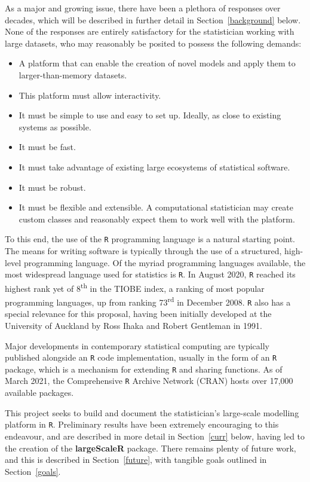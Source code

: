 As a major and growing issue, there have been a plethora of responses over decades, which will be described in further detail in Section~\ref{background} below.
None of the responses are entirely satisfactory for the statistician working with large datasets, who may reasonably be posited to possess the following demands:

\begin{itemize}
        \item A platform that can enable the creation of novel models and apply them to larger-than-memory datasets.
        \item This platform must allow interactivity.
        \item It must be simple to use and easy to set up.
                Ideally, as close to existing systems as possible.
        \item It must be fast.
        \item It must take advantage of existing large ecosystems of statistical software.
        \item It must be robust.
        \item It must be flexible and extensible.
                A computational statistician may create custom classes and reasonably expect them to work well with the platform.
\end{itemize}

To this end, the use of the \texttt{R} programming language is a natural starting point.
The means for writing software is typically through the use of a structured, high-level programming language.
Of the myriad programming languages available, the most widespread language used for statistics is \texttt{R}.
In August 2020, \texttt{R} reached its highest rank yet of 8\textsuperscript{th} in the TIOBE index, a ranking of most popular programming languages, up from ranking 73\textsuperscript{rd} in December 2008\cite{tiobe2021r}.
\texttt{R} also has a special relevance for this proposal, having been initially developed at the University of Auckland by Ross Ihaka and Robert Gentleman in 1991\cite{ihaka1996r}.

Major developments in contemporary statistical computing are typically published alongside an \texttt{R} code implementation, usually in the form of an \texttt{R} package, which is a mechanism for extending \texttt{R} and sharing functions.
As of March 2021, the Comprehensive \texttt{R} Archive Network (CRAN) hosts over 17,000 available packages\cite{team20:_r}.

This project seeks to build and document the statistician's large-scale modelling platform in \texttt{R}.
Preliminary results have been extremely encouraging to this endeavour, and are described in more detail in Section~\ref{curr} below, having led to the creation of the \textbf{largeScaleR} package\cite{cairns2020largescaler}.
There remains plenty of future work, and this is described in Section~\ref{future}, with tangible goals outlined in Section~\ref{goals}.
